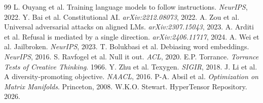 \documentclass[11pt,a4paper]{article}
\theoremstyle{plain}\newtheorem{theorem}{Theorem}[section]
\begin{document}
\begin{thebibliography}{99}
 L. Ouyang et al. Training language models to follow instructions. \textit{NeurIPS}, 2022.
 Y. Bai et al. Constitutional AI. \textit{arXiv:2212.08073}, 2022.
 A. Zou et al. Universal adversarial attacks on aligned LMs. \textit{arXiv:2307.15043}, 2023.
 A. Arditi et al. Refusal is mediated by a single direction. \textit{arXiv:2406.11717}, 2024.
 A. Wei et al. Jailbroken. \textit{NeurIPS}, 2023.
 T. Bolukbasi et al. Debiasing word embeddings. \textit{NeurIPS}, 2016.
 S. Ravfogel et al. Null it out. \textit{ACL}, 2020.
 E.P. Torrance. \textit{Torrance Tests of Creative Thinking}. 1966.
 Y. Zhu et al. Texygen. \textit{SIGIR}, 2018.
 J. Li et al. A diversity-promoting objective. \textit{NAACL}, 2016.
 P-A. Absil et al. \textit{Optimization on Matrix Manifolds}. Princeton, 2008.
 W.K.O. Stewart. HyperTensor Repository. 2026.
\end{thebibliography}
\end{document}

